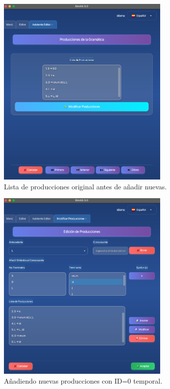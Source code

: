 \needspace{6cm}
\begin{figure}[H]
  \centering
  \includegraphics[width=0.75\textwidth]{figuras2/pruebas/editor/old_prod.png}
  \caption{Lista de producciones original antes de añadir nuevas.}
\end{figure}

\needspace{6cm}
\begin{figure}[H]
  \centering
  \includegraphics[width=0.75\textwidth]{figuras2/pruebas/editor/mod_prod.png}
  \caption{Añadiendo nuevas producciones con ID=0 temporal.}
\end{figure}


